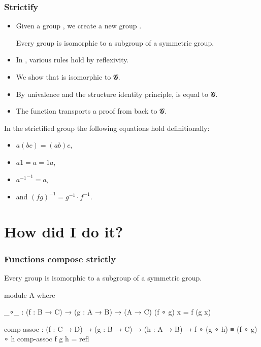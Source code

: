 \documentclass[presentation]{beamer}
\begin{document}
\begin{frame}
  \frametitle{Strictify}
  \begin{itemize}
  \item Given a group , we create a new group \AgdaSpace{}.
    \begin{theorem}
      Every group is isomorphic to a subgroup of a symmetric group.
    \end{theorem}
  \item In \AgdaSpace{}, various rules hold by reflexivity.
  \item We show that \AgdaSpace{} is isomorphic to 𝓖.
  \item By univalence and the structure identity principle, \AgdaSpace{} is equal to 𝓖.
  \item The  function transports a proof from \AgdaSpace{} back to 𝓖.
  \end{itemize}
\end{frame}


\begin{frame}
   In the strictified group the following equations hold definitionally:
  \begin{itemize}
  \item \(a  (b c) = (a b) c\),
  \item \(a 1 = a = 1 a\),
  \item \({a^{-1}}^{-1} = a\),
  \item and \((f g)^{-1} = g^{-1} \cdot f^{-1}\).
  \end{itemize}
\end{frame}

\section{How did I do it?}

\begin{frame}
  \frametitle{Functions compose strictly}
  \begin{theorem}
    Every group is isomorphic to a subgroup of a symmetric group.
  \end{theorem}

  \pause{}
  \begin{code}[hide]
    module A where
  \end{code}
  \begin{code}
      _∘_ : (f : B → C) → (g : A → B) → (A → C)
      (f ∘ g) x = f (g x)

      comp-assoc  :  (f : C → D)
                  →  (g : B → C)
                  →  (h : A → B)
                  →  f ∘ (g ∘ h) ≡ (f ∘ g) ∘ h
      comp-assoc f g h = refl
  \end{code}
\end{frame}
\end{document}
